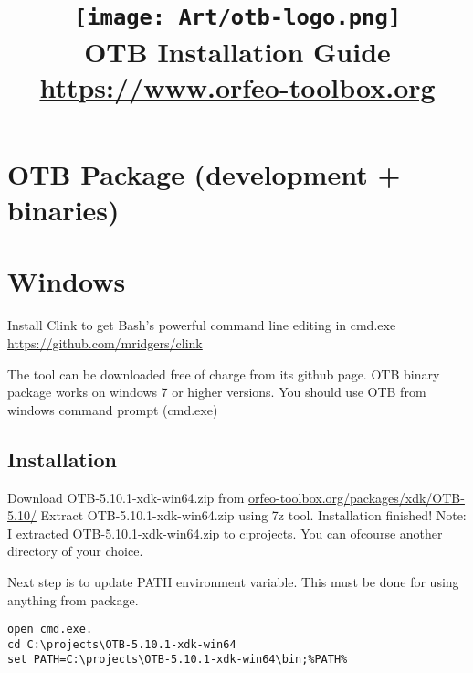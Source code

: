 \documentclass[10pt,a4paper]{article}
\title{\texttt{[image: Art/otb-logo.png]}\\
  OTB Installation Guide\\
  {\small\url{https://www.orfeo-toolbox.org}}
}
\begin{document}
\maketitle

\tableofcontents

\clearpage

\clearpage
\section{OTB Package (development + binaries)}



\section{Windows}

Install Clink to get Bash's powerful command line editing in cmd.exe \url{https://github.com/mridgers/clink}

The tool can be downloaded free of charge from its github page.
\newline
\newline
OTB binary package works on windows 7 or higher versions.
You should use OTB from windows command prompt (cmd.exe)

\subsection{Installation}

Download OTB-5.10.1-xdk-win64.zip from \url{orfeo-toolbox.org/packages/xdk/OTB-5.10/}
\newline
Extract OTB-5.10.1-xdk-win64.zip using 7z tool.
\newline
Installation finished!
\newline \newline
Note: I extracted OTB-5.10.1-xdk-win64.zip to c:projects.
\newline
You can ofcourse another directory of your choice.

Next step is to update PATH environment variable. This must be done for using anything from package.

\begin{verbatim}
open cmd.exe.
cd C:\projects\OTB-5.10.1-xdk-win64
set PATH=C:\projects\OTB-5.10.1-xdk-win64\bin;%PATH%
\end{verbatim}
\end{document}
